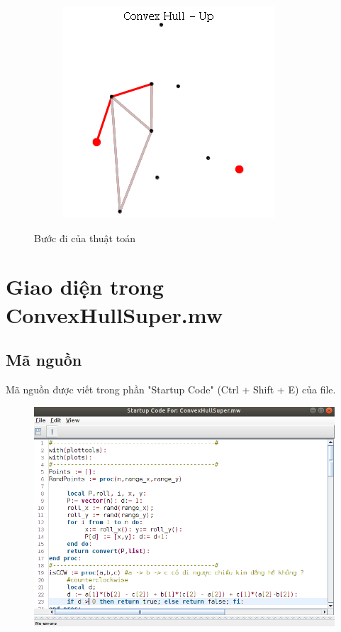 \documentclass[12pt]{article}
\begin{document}
\begin{figure}[h]
\begin{subfigure}[h]{0.275\linewidth}
              \caption{}
            \end{subfigure}
            \begin{subfigure}[h]{0.275\linewidth}
              \includegraphics[width=\linewidth]{GIF/Up-10}
              \caption{}
            \end{subfigure}
            \caption{Bước đi của thuật toán}
          \end{figure}
        \newpage
    \section{Giao diện trong ConvexHullSuper.mw}
      \subsection{Mã nguồn}  
        Mã nguồn được viết trong phần "Startup Code" (Ctrl + Shift + E)
        của file.
        \begin{figure}[h!]
          \centering
          \includegraphics[scale=0.5]{Image/codeMaple}
        \end{figure}
        \newpage
\end{document}
